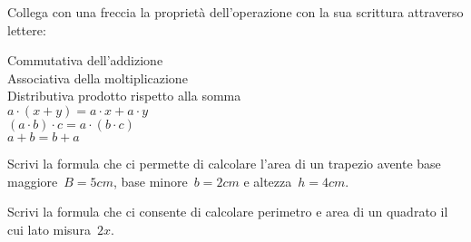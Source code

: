 
\begin{esercizio}
\label{ese:9.4} %
 Collega con una freccia la proprietà dell'operazione con la sua scrittura attraverso lettere:
 \begin{multicols}{2}
 \noindent
 Commutativa dell'addizione\\
 Associativa della moltiplicazione\\
 Distributiva prodotto rispetto alla somma\\
 $a\cdot (x+y)=a\cdot x+a\cdot y$\\
 $\left(a\cdot b\right)\cdot c=a\cdot \left(b\cdot c\right)$\\
 ${a+b=b+a}$
 \end{multicols}
\end{esercizio}

%

\begin{esercizio}
\label{ese:9.5} %
Scrivi la formula che ci permette di calcolare l'area di un trapezio avente base maggiore~$B=5\unit{cm}$, base minore~$b=2\unit{cm}$ e altezza~$h=4\unit{cm}$.
\end{esercizio}

\begin{esercizio}[\Ast]
\label{ese:9.6} %
Scrivi la formula che ci consente di calcolare perimetro e area di un quadrato il cui lato misura~$2x$.
\end{esercizio}

